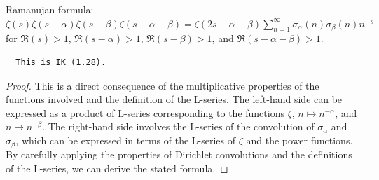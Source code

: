 \begin{theorem}
\label{zeta_mul_zeta_mul_zeta_mul_zeta_eq}
\leanok
Ramanujan formula: $\zeta(s)\zeta(s-\alpha)\zeta(s-\beta)\zeta(s-\alpha-\beta)=\zeta(2s-\alpha-\beta) \sum_{n=1}^{\infty} \sigma_\alpha(n)\sigma_\beta(n)n^{-s}$ for $\Re(s) > 1$, $\Re(s-\alpha) > 1$, $\Re(s-\beta) > 1$, and $\Re(s-\alpha-\beta) > 1$.
  \begin{verbatim}
  This is IK (1.28).
  \end{verbatim}
\end{theorem}
\begin{proof}
This is a direct consequence of the multiplicative properties of the functions involved and the definition of the L-series. The left-hand side can be expressed as a product of L-series corresponding to the functions $\zeta$, $n \mapsto n^{-\alpha}$, and $n \mapsto n^{-\beta}$. The right-hand side involves the L-series of the convolution of $\sigma_\alpha$ and $\sigma_\beta$, which can be expressed in terms of the L-series of $\zeta$ and the power functions. By carefully applying the properties of Dirichlet convolutions and the definitions of the L-series, we can derive the stated formula.
\end{proof}
